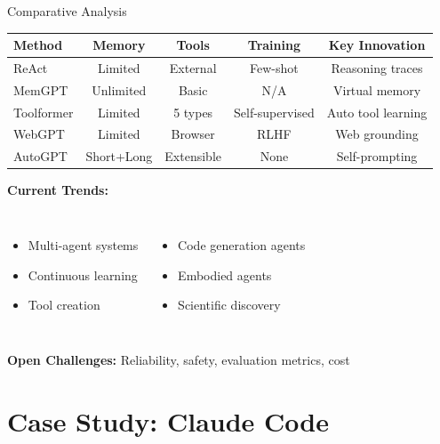 \documentclass[aspectratio=169]{beamer}
\begin{document}
\begin{frame}{Comparative Analysis}
	\begin{center}
		\small
		\begin{tabular}{|l|c|c|c|c|}
			\hline
			\textbf{Method} & \textbf{Memory} & \textbf{Tools} & \textbf{Training} & \textbf{Key Innovation} \\
			\hline
			ReAct & Limited & External & Few-shot & Reasoning traces \\
			MemGPT & {\color{highlight}Unlimited} & Basic & N/A & Virtual memory \\
			Toolformer & Limited & {\color{highlight}5 types} & Self-supervised & Auto tool learning \\
			WebGPT & Limited & Browser & {\color{highlight}RLHF} & Web grounding \\
			AutoGPT & Short+Long & Extensible & None & {\color{highlight}Self-prompting} \\
			\hline
		\end{tabular}
	\end{center}
	
	\vspace{0.5cm}
	
	\textbf{Current Trends:}
	\begin{columns}
		\begin{itemize}
			\item Multi-agent systems
			\item Continuous learning
			\item Tool creation
		\end{itemize}
		
		\begin{itemize}
			\item Code generation agents
			\item Embodied agents
			\item Scientific discovery
		\end{itemize}
	\end{columns}
	
	\vspace{0.3cm}
	\textbf{Open Challenges:} Reliability, safety, evaluation metrics, cost
\end{frame}

\section{Case Study: Claude Code}
\end{document}
